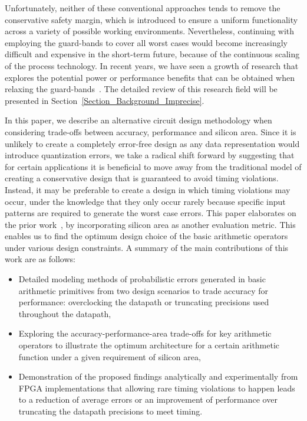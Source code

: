 \documentclass[prodmode,acmtrets]{acmsmall} %
\begin{document}
Unfortunately, neither of these conventional approaches tends to remove the conservative safety margin, which is introduced to ensure a uniform functionality across a variety of possible working environments. Nevertheless, continuing with employing the guard-bands to cover all worst cases would become increasingly difficult and expensive in the short-term future, because of the continuous scaling of the process technology. In recent years, we have seen a growth of research that explores the potential power or performance benefits that can be obtained when relaxing the guard-bands~\cite{NewBox2004}. The detailed review of this research field will be presented in Section~\ref{Section_Background_Imprecise}.

In this paper, we describe an alternative circuit design methodology when considering trade-offs between accuracy, performance and silicon area. Since it is unlikely to create a completely error-free design as any data representation would introduce quantization errors, we take a radical shift forward by suggesting that for certain applications it is beneficial to move away from the traditional model of creating a conservative design that is guaranteed to avoid timing violations. Instead, it may be preferable to create a design in which timing violations may occur, under the knowledge that they only occur rarely because specific input patterns are required to generate the worst case errors. This paper elaborates on the prior work~\cite{SKfccm13}, by incorporating silicon area as another evaluation metric. This enables us to find the optimum design choice of the basic arithmetic operators under various design constraints. A summary of the main contributions of this work are as follows:

\vspace{-.5ex}
\begin{itemize}
\item Detailed modeling methods of probabilistic errors generated in basic arithmetic primitives from two design scenarios to trade accuracy for performance: overclocking the datapath or truncating precisions used throughout the datapath,
\item Exploring the accuracy-performance-area trade-offs for key arithmetic operators to illustrate the optimum architecture for a certain arithmetic function under a given requirement of silicon area,
\item Demonstration of the proposed findings analytically and experimentally from FPGA implementations that allowing rare timing violations to happen leads to a reduction of average errors or an improvement of performance over truncating the datapath precisions to meet timing.
\end{itemize}
\end{document}

